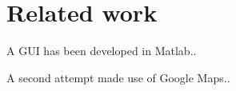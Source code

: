 \chapter{Related work}
A GUI has been developed in Matlab..

A second attempt made use of Google Maps..